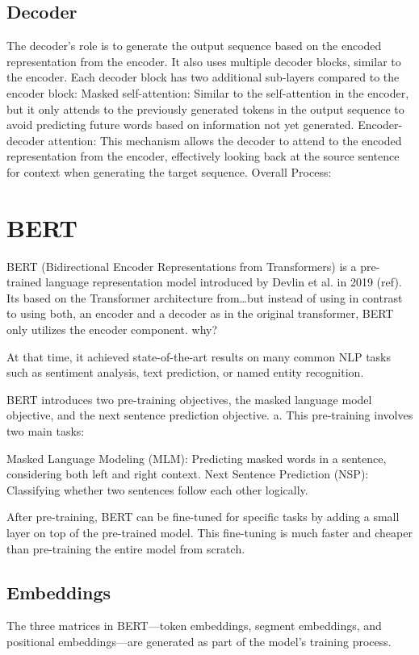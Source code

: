 \subsection{Decoder}
The decoder's role is to generate the output sequence based on the encoded representation from the encoder.
It also uses multiple decoder blocks, similar to the encoder.
Each decoder block has two additional sub-layers compared to the encoder block:
Masked self-attention: Similar to the self-attention in the encoder, but it only attends to the previously generated tokens in the output sequence to avoid predicting future words based on information not yet generated.
Encoder-decoder attention: This mechanism allows the decoder to attend to the encoded representation from the encoder, effectively looking back at the source sentence for context when generating the target sequence.
Overall Process:





\section{BERT}
BERT (Bidirectional Encoder Representations from Transformers) is a  pre-trained language representation model introduced by Devlin et al. in 2019 (ref). Its based on the Transformer architecture from\dots but instead of using in contrast to using both, an encoder and a decoder as in the original transformer, BERT only utilizes the encoder component.
why?


At that time, it achieved state-of-the-art results on many
common NLP tasks such as sentiment analysis, text prediction, or named entity recognition.

BERT introduces two pre-training
objectives, the masked language model objective, and the next sentence prediction objective.
a. This pre-training involves two main tasks:

Masked Language Modeling (MLM): Predicting masked words in a sentence, considering both left and right context.
Next Sentence Prediction (NSP): Classifying whether two sentences follow each other logically.

After pre-training, BERT can be fine-tuned for specific tasks by adding a small layer on top of the pre-trained model. This fine-tuning is much faster and cheaper than pre-training the entire model from scratch. 

\subsection{Embeddings}
The three matrices in BERT—token embeddings, segment embeddings, and positional embeddings—are generated as part of the model's training process. 

